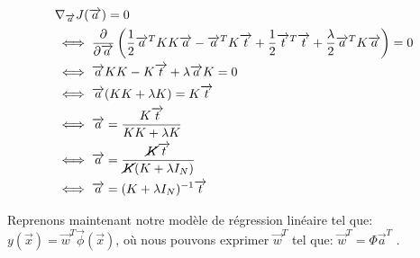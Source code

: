 \begin{equation}
\begin{split}
	&\nabla_{\overrightarrow{a}} J(\overrightarrow{a}) = 0 \\
	&\iff \frac{\partial}{\partial \overrightarrow{a}} \left(\frac{1}{2} \overrightarrow{a}^T K K \overrightarrow{a} - \overrightarrow{a}^T K \overrightarrow{t} + \frac{1}{2} \overrightarrow{t}^T \overrightarrow{t} + \frac{\lambda}{2} \overrightarrow{a}^T K \overrightarrow{a}\right) = 0 \\
	&\iff \overrightarrow{a} K K - K \overrightarrow{t} + \lambda \overrightarrow{a} K = 0 \\
	&\iff \overrightarrow{a}(KK+\lambda K) = K \overrightarrow{t}\\
	&\iff \overrightarrow{a} = \frac{K \overrightarrow{t}}{KK + \lambda K} \\
	&\iff \overrightarrow{a} = \frac{\cancel{K} \overrightarrow{t}}{\cancel{K}(K+\lambda I_N)} \\
	&\iff \overrightarrow{a} = (K + \lambda I_N)^{-1} \overrightarrow{t}
\end{split}
\end{equation}

Reprenons maintenant notre modèle de régression linéaire tel que: $ y(\overrightarrow{x}) = \overrightarrow{w}^T \overrightarrow{\phi}(\overrightarrow{x}) $, où nous pouvons exprimer $ \overrightarrow{w}^T $ tel que: $\overrightarrow{w}^T = \Phi \overrightarrow{a}^T$ .

